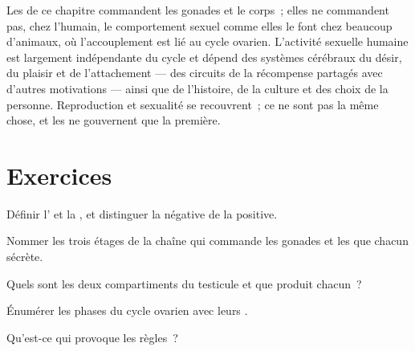 \begin{remark}\label{rem:g11:hormones-and-reproduction:brain}
Les  de ce chapitre commandent les gonades et le corps~; elles
ne commandent pas, chez l'humain, le comportement sexuel comme elles le
font chez beaucoup d'animaux, où l'accouplement est lié au cycle
ovarien. L'activité sexuelle humaine est largement indépendante du
cycle et dépend des systèmes cérébraux du désir, du plaisir et de
l'attachement --- des circuits de la récompense partagés avec d'autres
motivations --- ainsi que de l'histoire, de la culture et des choix de
la personne. Reproduction et sexualité se recouvrent~; ce ne sont pas
la même chose, et les  ne gouvernent que la première.
\end{remark}

\section{Exercices}

\begin{exercise}[$\star$]\label{exo:g11:hormones-and-reproduction:1}
Définir l' et la , et distinguer la 
négative de la positive.
\end{exercise}

\begin{exercise}[$\star$]\label{exo:g11:hormones-and-reproduction:2}
Nommer les trois étages de la chaîne qui commande les gonades et les
 que chacun sécrète.
\end{exercise}

\begin{exercise}[$\star$]\label{exo:g11:hormones-and-reproduction:3}
Quels sont les deux compartiments du testicule et que produit chacun~?
\end{exercise}

\begin{exercise}[$\star$]\label{exo:g11:hormones-and-reproduction:4}
Énumérer les phases du cycle ovarien avec leurs .
\end{exercise}

\begin{exercise}[$\star$]\label{exo:g11:hormones-and-reproduction:5}
Qu'est-ce qui provoque les règles~?
\end{exercise}


